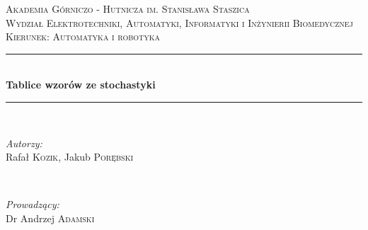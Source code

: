 \begin{titlepage}

\newcommand{\HRule}{\rule{\linewidth}{0.5mm}} %

\center %
 

\textsc{\LARGE Akademia Górniczo - Hutnicza im. Stanisława Staszica}\\[1.5cm] %
\textsc{\Large Wydział Elektrotechniki, Automatyki, Informatyki i Inżynierii Biomedycznej}\\[0.5cm] %
\textsc{\large Kierunek: Automatyka i robotyka}\\[0.5cm] %


\HRule \\[0.4cm]
{ \huge \bfseries Tablice wzorów ze stochastyki}\\[0.4cm] %
\HRule \\[1.5cm]
 
%
\begin{minipage}{0.4\textwidth}
\begin{flushleft} \large
\emph{Autorzy:}\\
Rafał \textsc{Kozik}, Jakub \textsc{Porębski}%
\end{flushleft}
\end{minipage}
~
\begin{minipage}{0.4\textwidth}
\begin{flushright} \large
\emph{Prowadzący:} \\
Dr Andrzej \textsc{Adamski} %
\end{flushright}
\end{minipage}\\[4cm]



\end{titlepage}
